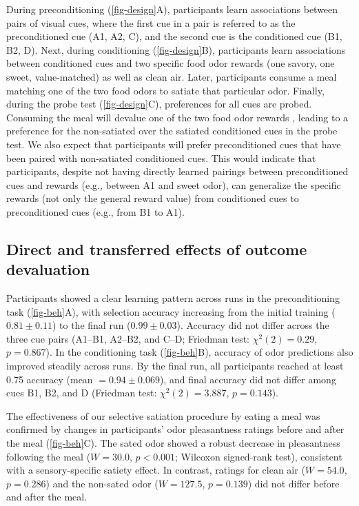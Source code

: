 \documentclass[12pt,letterpaper]{article}
\begin{document}
During preconditioning (\autoref{fig-design}A), participants learn associations between pairs of visual cues, where the first cue in a pair is referred to as the preconditioned cue (A1, A2, C), and the second cue is the conditioned cue (B1, B2, D). Next, during conditioning (\autoref{fig-design}B), participants learn associations between conditioned cues and two specific food odor rewards (one savory, one sweet, value-matched) as well as clean air. Later, participants consume a meal matching one of the two food odors to satiate that particular odor. Finally, during the probe test (\autoref{fig-design}C), preferences for all cues are probed. Consuming the meal will devalue one of the two food odor rewards \cite{howard2017identity,HowRey2020,liu2025distinct}, leading to a preference for the non-satiated over the satiated conditioned cues in the probe test. We also expect that participants will prefer preconditioned cues that have been paired with non-satiated conditioned cues. This would indicate that participants, despite not having directly learned pairings between preconditioned cues and rewards (e.g., between A1 and sweet odor), can generalize the specific rewards (not only the general reward value) from conditioned cues to preconditioned cues (e.g., from B1 to A1).




\subsection*{Direct and transferred effects of outcome devaluation}
\label{subsec-beh}


Participants showed a clear learning pattern across runs in the preconditioning task (\autoref{fig-beh}A), with selection accuracy increasing from the initial training ($0.81 \pm 0.11$) to the final run ($0.99 \pm 0.03$). Accuracy did not differ across the three cue pairs (A1--B1, A2--B2, and C--D; Friedman test: $\chi^2(2) = 0.29$, $p = 0.867$). In the conditioning task (\autoref{fig-beh}B), accuracy of odor predictions also improved steadily across runs. By the final run, all participants reached at least 0.75 accuracy (mean $= 0.94 \pm 0.069$), and final accuracy did not differ among cues B1, B2, and D (Friedman test: $\chi^2(2) = 3.887$, $p = 0.143$).


The effectiveness of our selective satiation procedure by eating a meal was confirmed by changes in participants’ odor pleasantness ratings before and after the meal (\autoref{fig-beh}C). The sated odor showed a robust decrease in pleasantness following the meal ($W = 30.0$, $p < 0.001$; Wilcoxon signed-rank test), consistent with a sensory-specific satiety effect. In contrast, ratings for clean air ($W = 54.0$, $p = 0.286$) and the non-sated odor ($W = 127.5$, $p = 0.139$) did not differ before and after the meal.
\end{document}
